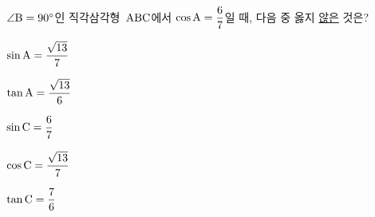 $\angle\mathrm{B}=90^\circ$인 직각삼각형~$\mathrm{ABC}$에서 $\cos\mathrm{A}=\dfrac{6}{7}$일 때, 다음 중 옳지 \underline{않은} 것은?
\begin{choicesii}{\rule[-3ex]{0pt}{8ex}$\sin\mathrm{A}=\dfrac{\sqrt{13}}{7}$}{\rule[-3ex]{0pt}{8ex}$\tan\mathrm{A}=\dfrac{\sqrt{13}}{6}$}{\rule[-3ex]{0pt}{8ex}$\sin\mathrm{C}=\dfrac{6}{7}$}{\rule[-3ex]{0pt}{8ex}$\cos\mathrm{C}=\dfrac{\sqrt{13}}{7}$}{\rule[-3ex]{0pt}{8ex}$\tan\mathrm{C}=\dfrac{7}{6}$}\end{choicesii}
